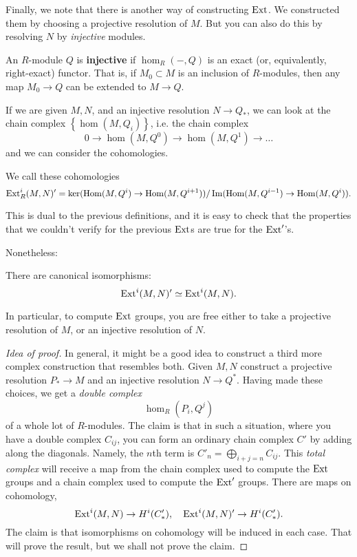 Finally, we note that there is another way of constructing
$\operatorname{Ext}$. We
constructed them by choosing a projective resolution of $M$. But
you can also
do this by resolving $N$ by \emph{injective} modules.
\begin{definition}
An $R$-module $Q$ is \textbf{injective} if $\hom_R(-,Q)$ is an
exact (or,
equivalently, right-exact) functor. That is, if $M_0 \subset M$
is an inclusion
of $R$-modules, then any map $M_0 \to Q$ can be extended to $M
\to Q$.
\end{definition}

If we are given $M,N$, and an injective resolution $N \to Q_*$,
we can look at
the chain complex $\left\{\hom(M,Q_i)\right\}$, i.e. the chain
complex
\[ 0 \to \hom(M, Q^0) \to \hom(M, Q^1) \to \dots  \]
and we can consider the cohomologies.

\begin{definition}
We call these cohomologies
\[ \operatorname{Ext}^i_R(M,N)' = \ker(\operatorname{Hom}(M, Q^i) \to \operatorname{Hom}(M,
Q^{i+1}))/\operatorname{Im}(\operatorname{Hom}(M,
Q^{i-1}) \to \operatorname{Hom}(M, Q^i)).  \]
\end{definition}

This is dual to the previous definitions, and it is easy to
check that the
properties that we couldn't verify for the previous $\operatorname{Ext}$s are
true for the
$\operatorname{Ext}'$'s.

Nonetheless:

\begin{theorem}
There are canonical isomorphisms:
\[ \operatorname{Ext}^i(M,N)' \simeq \operatorname{Ext}^i(M,N).  \]
\end{theorem}

In particular, to compute $\operatorname{Ext}$ groups, you are free either to
take a
projective resolution of $M$, or an injective resolution of
$N$.\begin{proof}[Idea of proof]
In general, it might be a good idea to construct a third more
complex
construction that resembles both. Given $M,N$ construct a
projective resolution
$P_* \to M$ and an injective resolution $N \to Q^*$. Having made
these choices,
we get a \emph{double complex}
\[ \hom_R(P_i, Q^j)  \]
of a whole lot of $R$-modules. The claim is that in such a
situation, where
you have a double complex $C_{ij}$, you can
form an ordinary chain complex $C'$
by adding along the diagonals. Namely, the $n$th term
is $C'_n = \bigoplus_{i+j=n} C_{ij}$. This \emph{total complex}
will receive a
map from the chain complex used to compute the $\operatorname{Ext}$ groups
and a chain
complex used to compute the $\operatorname{Ext}'$ groups. There are maps on
cohomology,
\[ \operatorname{Ext}^i(M,N) \to H^i(C'_*), \quad \operatorname{Ext}^i(M,N)' \to H^i(C'_*).
\]
The claim is that isomorphisms on
cohomology will be induced in each case. That will prove the
result, but we
shall not prove the claim.
\end{proof}

